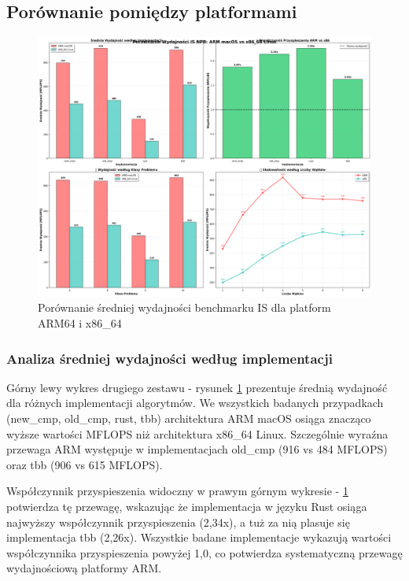 \subsection{Porównanie pomiędzy platformami}
\begin{figure}[H]
    \centering
    \includegraphics[width=\textwidth]{analiza/images/parallel/is/compare/is_porownanie_platform_arm_vs_x86.png}
    \caption{Porównanie średniej wydajności benchmarku IS dla platform ARM64 i x86\_64}
    \label{is_porownanie_wydajnosci_platformy}
\end{figure}
\subsubsection{Analiza średniej wydajności według implementacji}
Górny lewy wykres drugiego zestawu - rysunek \ref{is_porownanie_wydajnosci_platformy} prezentuje średnią wydajność dla różnych implementacji algorytmów. We wszystkich badanych przypadkach (new\_cmp, old\_cmp, rust, tbb) architektura ARM macOS osiąga znacząco wyższe wartości MFLOPS niż architektura x86\_64 Linux. Szczególnie wyraźna przewaga ARM występuje w implementacjach old\_cmp (916 vs 484 MFLOPS) oraz tbb (906 vs 615 MFLOPS).

Współczynnik przyspieszenia widoczny w prawym górnym wykresie - \ref{is_porownanie_wydajnosci_platformy} potwierdza tę przewagę, wskazując że implementacja w języku Rust osiąga najwyższy współczynnik przyspieszenia (2,34x), a tuż za nią plasuje się implementacja tbb (2,26x). Wszystkie badane implementacje wykazują wartości współczynnika przyspieszenia powyżej 1,0, co potwierdza systematyczną przewagę wydajnościową platformy ARM.

